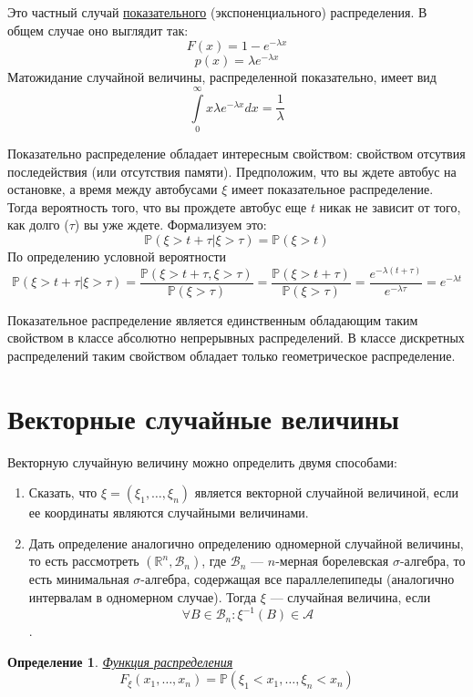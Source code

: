 \documentclass[12pt]{article}
\newtheorem{Def}{Определение}
\numberwithin{Th}{section}
\numberwithin{Def}{section}
\numberwithin{Lem}{section}
\numberwithin{St}{section}
\numberwithin{equation}{section}
\newcommand\Pro{\mathbb{P}} %
\newcommand\Ev{\mathscr{A}} %
\newcommand\Bor{\mathscr{B}} %
\newcommand\Real{\mathbb{R}} %
\begin{document}
Это частный случай \underline{показательного} (экспоненциального) распределения. В общем случае оно выглядит так:
$$F(x) = 1 - e^{-\lambda x}$$
$$p(x) = \lambda e^{-\lambda x}$$
Матожидание случайной величины, распределенной показательно, имеет вид
$$\int\limits_0^{\infty} x\lambda e^{-\lambda x}dx = \frac1{\lambda}$$

Показательно распределение обладает интересным свойством: свойством отсутвия последействия (или отсутствия памяти). Предположим, что вы ждете автобус на 
остановке, а время между автобусами $\xi$ имеет показательное распределение. Тогда вероятность того, что вы прождете автобус еще $t$ никак не зависит от того, 
как долго ($\tau$) вы уже ждете. Формализуем это:
$$ \Pro(\xi > t + \tau | \xi > \tau) = \Pro(\xi > t)$$
По определению условной вероятности
$$\Pro(\xi > t + \tau | \xi > \tau) = \frac{\Pro(\xi > t + \tau, \xi > \tau)}{\Pro(\xi > \tau)} = \frac{\Pro(\xi > t + \tau)}{\Pro(\xi > \tau)} = \frac{e^{-\lambda(t+\tau)}}{e^{-\lambda \tau}} = e^{-\lambda t}$$

Показательное распределение является единственным обладающим таким свойством в классе абсолютно непрерывных распределений. В классе дискретных распределений таким свойством обладает только геометрическое распределение.

\newpage
\section{Векторные случайные величины}
Векторную случайную величину можно определить двумя способами:
\begin{enumerate}
	\item Сказать, что $\xi = (\xi_1, \ldots, \xi_n)$ является векторной случайной величиной, если ее координаты являются случайными величинами.
	\item Дать определение аналогично определению одномерной случайной величины, то есть рассмотреть $(\Real^n, \Bor_n)$, где $\Bor_n$ --- $n$-мерная борелевская
	$\sigma$-алгебра, то есть минимальная $\sigma$-алгебра, содержащая все параллелепипеды (аналогично интервалам в одномерном случае). Тогда $\xi$ --- случайная величина, если $$\forall B \in \Bor_n \colon \xi^{-1}(B) \in \Ev$$. 
\end{enumerate}

\begin{Def}
\underline{Функция распределения} $$F_\xi(x_1, \ldots, x_n) = \Pro(\xi_1 < x_1, \ldots, \xi_n < x_n)$$
\end{Def}
\end{document}

